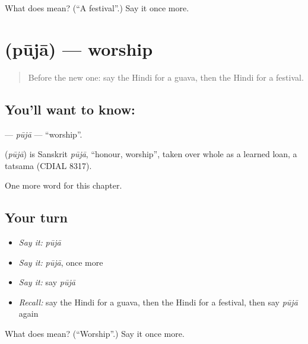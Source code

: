 \begin{tcolorbox}[breakable,colback=teal!4,colframe=teal!35!black,title={Before you move on}]
What does  mean? (\textquotedblleft{}A festival\textquotedblright{}.) Say it once more.
\end{tcolorbox}
\section[\texorpdfstring{\hi{पूजा} (pūjā)}{पूजा (pūjā)}]{ (pūjā) — worship}

\label{lesson:HI-C217-puja}



\begin{quote}
Before the new one: say the Hindi for a guava, then the Hindi for a festival.
\end{quote}

\subsection*{You'll want to know: }
\textbf{} — \emph{pūjā} — \textquotedblleft{}worship\textquotedblright{}.

\begin{cousinweb}
\textbf{} (\emph{pūjā}) is Sanskrit \emph{pūjā}, \textquotedblleft{}honour, worship\textquotedblright{}, taken over whole as a learned loan, a tatsama (CDIAL 8317).
\end{cousinweb}

\begin{grammarlens}[title={What you've built}]
One more word for this chapter.
\end{grammarlens}

\subsection*{Your turn}
\begin{itemize}
\raggedright
  \item \emph{Say it:} \emph{pūjā}
  \item \emph{Say it:} \emph{pūjā}, once more
  \item \emph{Say it:} say \emph{pūjā}
  \item \emph{Recall:} say the Hindi for a guava, then the Hindi for a festival, then say \emph{pūjā} again
\end{itemize}

\begin{tcolorbox}[breakable,colback=teal!4,colframe=teal!35!black,title={Before you move on}]
What does  mean? (\textquotedblleft{}Worship\textquotedblright{}.) Say it once more.
\end{tcolorbox}
